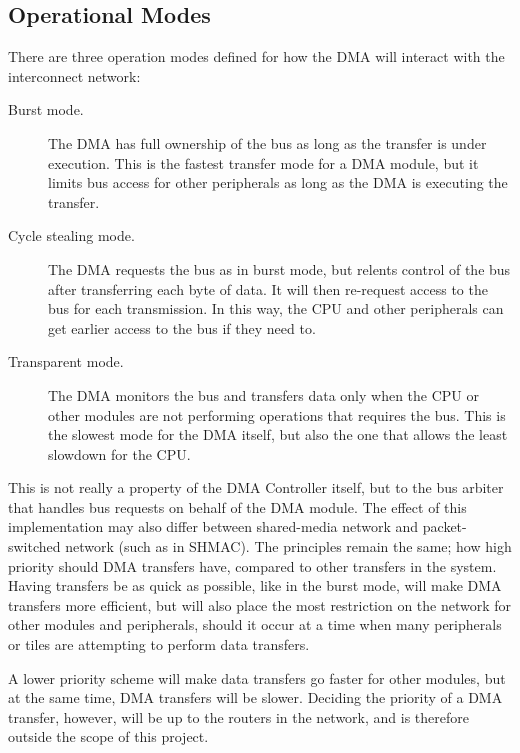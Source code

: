 \subsection{Operational Modes}
There are three operation modes defined for how the DMA will interact with the interconnect network:
\begin{description}
    \item[Burst mode.] \cite{encyclopedia}
    The DMA has full ownership of the bus as long as the transfer is under execution.
    This is the fastest transfer mode for a DMA module, but it limits bus access for other
    peripherals as long as the DMA is executing the transfer.

    \item[Cycle stealing mode.] \cite{encyclopedia}
    The DMA requests the bus as in burst mode, but relents control of the bus after transferring
    each byte of data. It will then re-request access to the bus for each transmission.
    In this way, the CPU and other peripherals can get earlier access to the bus if they need to.

    \item[Transparent mode.] \cite{dma-lecture}
    The DMA monitors the bus and transfers data only when the CPU or other modules are not performing operations that requires the bus.
    This is the slowest mode for the DMA itself, but also the one that allows the least slowdown for the CPU.
\end{description}

This is not really a property of the DMA Controller itself, but to the bus arbiter that handles bus requests on behalf of the DMA module.
The effect of this implementation may also differ between shared-media network and packet-switched network (such as in SHMAC).
The principles remain the same; how high priority should DMA transfers have, compared to other transfers in the system. 
Having transfers be as quick as possible, like in the burst mode, will make DMA transfers more efficient, but will also place the most restriction on the network for other modules and peripherals, should it occur at a time when many peripherals or tiles are attempting to perform data transfers.

A lower priority scheme will make data transfers go faster for other modules, but at
the same time, DMA transfers will be slower. Deciding the priority of a DMA transfer,
however, will be up to the routers in the network,  and is therefore outside the scope of this project.

